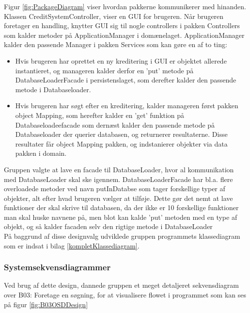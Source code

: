 Figur \ref{fig:PackageDiagram} viser hvordan pakkerne kommunikerer med hinanden.
Klassen CreditSystemController, viser en GUI for brugeren. Når brugeren
foretager en handling, knytter GUI sig til nogle controllers i pakken
Controllers som kalder metoder på ApplicationManager i domænelaget.
ApplicationManager kalder den passende Manager i pakken Services som kan gøre en
af to ting: 

\begin{itemize}
    \item Hvis brugeren har oprettet en ny kreditering i GUI er objektet
        allerede instantieret, og manageren kalder derfor en 'put' metode på
        DatabaseLoaderFacade i persistenslaget, som derefter kalder den passende
        metode i Databaseloader. 
    \item Hvis brugeren har søgt efter en kreditering, kalder manageren først
        pakken object Mapping, som herefter kalder en 'get' funktion på
        Databaseloadeefacade som dernæst kalder den passende metode på
        Databaseloader der querier databasen, og returnerer resultaterne. Disse
        resultater får object Mapping pakken, og indstanierer objekter via data
        pakken i domain.
\end{itemize}

Gruppen valgte at lave en facade til DatabaseLoader, hvor al kommunikation med
DatabaseLoader skal ske igennem. DatabaseLoaderFacade har bl.a. flere
overloadede metoder ved navn putInDatabse som tager forskellige typer af
objekter, alt efter hvad brugeren vælger at tilføje. Dette gør det nemt at lave
funktioner der skal skrive til databasen, da der ikke er 10 forskellige
funktioner man skal huske navnene på, men blot kan kalde 'put' metoden med en
type af objekt, og så kalder facaden selv den rigtige metode i DatabaseLoader
\\
På baggrund af disse designvalg udviklede gruppen programmets klassediagram som
er indsat i bilag \ref{kompletKlassediagram}. 

\subsubsection{Systemsekvensdiagrammer}%
\label{ssub:systemsekvensdiagrammer}
Ved brug af dette design, dannede gruppen et meget detaljeret sekvensdiagram over B03: Foretage en søgning, for at visualisere flowet i programmet som kan ses på figur \ref{fig:B03OSDDesign}


